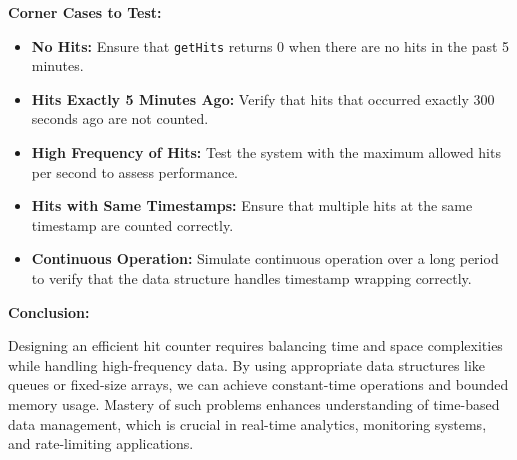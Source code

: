 \textbf{Corner Cases to Test:}

\begin{itemize}
    \item \textbf{No Hits:} Ensure that \texttt{getHits} returns 0 when there are no hits in the past 5 minutes.
    \item \textbf{Hits Exactly 5 Minutes Ago:} Verify that hits that occurred exactly 300 seconds ago are not counted.
    \item \textbf{High Frequency of Hits:} Test the system with the maximum allowed hits per second to assess performance.
    \item \textbf{Hits with Same Timestamps:} Ensure that multiple hits at the same timestamp are counted correctly.
    \item \textbf{Continuous Operation:} Simulate continuous operation over a long period to verify that the data structure handles timestamp wrapping correctly.
\end{itemize}

\textbf{Conclusion:}

Designing an efficient hit counter requires balancing time and space complexities while handling high-frequency data. By using appropriate data structures like queues or fixed-size arrays, we can achieve constant-time operations and bounded memory usage. Mastery of such problems enhances understanding of time-based data management, which is crucial in real-time analytics, monitoring systems, and rate-limiting applications.